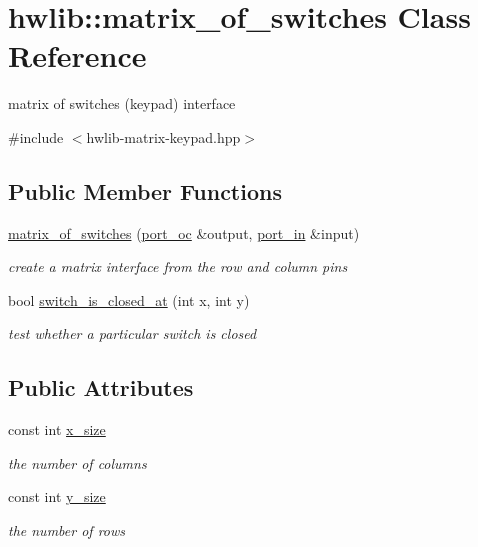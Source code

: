 \hypertarget{classhwlib_1_1matrix__of__switches}{}\section{hwlib\+:\+:matrix\+\_\+of\+\_\+switches Class Reference}
\label{classhwlib_1_1matrix__of__switches}


matrix of switches (keypad) interface  




{\ttfamily \#include $<$hwlib-\/matrix-\/keypad.\+hpp$>$}

\subsection*{Public Member Functions}
\begin{DoxyCompactItemize}
\item 
\hyperlink{classhwlib_1_1matrix__of__switches_a7b6df331ad1f31001ec0ab3ac51ecbc9}{matrix\+\_\+of\+\_\+switches} (\hyperlink{classhwlib_1_1port__oc}{port\+\_\+oc} \&output, \hyperlink{classhwlib_1_1port__in}{port\+\_\+in} \&input)
\begin{DoxyCompactList}\small\item\em create a matrix interface from the row and column pins \end{DoxyCompactList}\item 
bool \hyperlink{classhwlib_1_1matrix__of__switches_a6ae62c16d59ef6830a3230d52bf08f64}{switch\+\_\+is\+\_\+closed\+\_\+at} (int x, int y)
\begin{DoxyCompactList}\small\item\em test whether a particular switch is closed \end{DoxyCompactList}\end{DoxyCompactItemize}
\subsection*{Public Attributes}
\begin{DoxyCompactItemize}
\item 
const int \hyperlink{classhwlib_1_1matrix__of__switches_ab9bc5a395efdaa418d843ecfc275a081}{x\+\_\+size}\hypertarget{classhwlib_1_1matrix__of__switches_ab9bc5a395efdaa418d843ecfc275a081}{}\label{classhwlib_1_1matrix__of__switches_ab9bc5a395efdaa418d843ecfc275a081}

\begin{DoxyCompactList}\small\item\em the number of columns \end{DoxyCompactList}\item 
const int \hyperlink{classhwlib_1_1matrix__of__switches_ac87ec85080691bc41466468e95316a34}{y\+\_\+size}\hypertarget{classhwlib_1_1matrix__of__switches_ac87ec85080691bc41466468e95316a34}{}\label{classhwlib_1_1matrix__of__switches_ac87ec85080691bc41466468e95316a34}

\begin{DoxyCompactList}\small\item\em the number of rows \end{DoxyCompactList}\end{DoxyCompactItemize}


